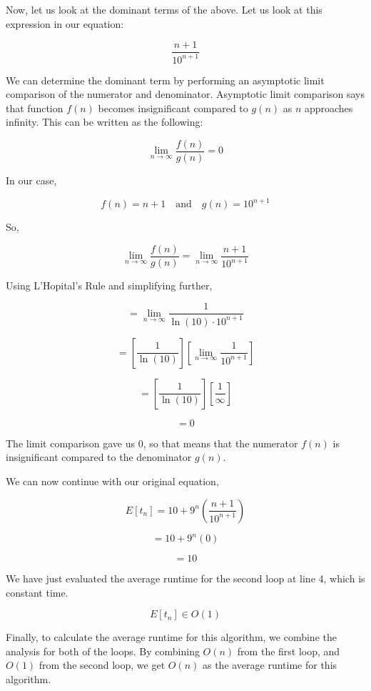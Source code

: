 \documentclass[10pt]{article}
\begin{document}
Now, let us look at the dominant terms of the above. Let us look at this expression in our equation:

\[
\frac{n+1}{10^{n+1}}
\]

We can determine the dominant term by performing an asymptotic limit comparison of the numerator and denominator. Asymptotic limit comparison says that function \( f(n) \) becomes insignificant compared to \( g(n) \) as \( n \) approaches infinity. This can be written as the following:

\[
\lim_{n \to \infty} \frac{f(n)}{g(n)} = 0
\]

In our case,

\[
f(n) = n + 1 \quad \text{and} \quad g(n) = 10^{n+1}
\]

So,

\[
\lim_{n \to \infty} \frac{f(n)}{g(n)} = \lim_{n \to \infty} \frac{n+1}{10^{n+1}}
\]

Using L'Hopital's Rule and simplifying further,

\[
= \lim_{n \to \infty} \frac{1}{\ln(10) \cdot 10^{n+1}}
\]

\[
= \left[ \frac{1}{\ln(10)} \right] \left[ \lim_{n \to \infty} \frac{1}{10^{n+1}} \right]
\]

\[
= \left[ \frac{1}{\ln(10)} \right] \left[ \frac{1}{\infty} \right]
\]

\[
= 0
\]

The limit comparison gave us 0, so that means that the numerator \( f(n) \) is insignificant compared to the denominator \( g(n) \).

We can now continue with our original equation,

\[
E[t_n] = 10 + 9^n \left( \frac{n+1}{10^{n+1}} \right)
\]

\[
= 10 + 9^n (0)
\]

\[
= 10
\]

We have just evaluated the average runtime for the second loop at line 4, which is constant time.

\[
E[t_n] \in O(1)
\]

\text Finally, to calculate the average runtime for this algorithm, we combine the analysis for both of the loops. By combining \(O(n)\) from the first loop, and \(O(1)\) from the second loop, we get \(O(n)\) as the average runtime for this algorithm.\\

 \\
\end{document}
